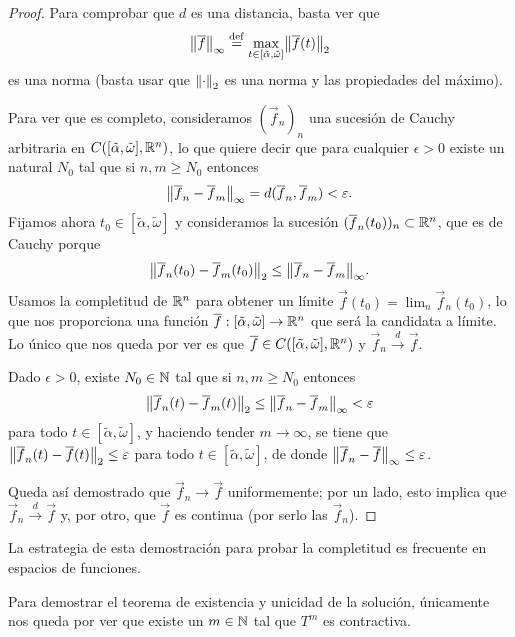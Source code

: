\documentclass[../ecuaciones_diferenciales.tex]{subfiles}
\begin{document}
\begin{proof}
	Para comprobar que \(d\) es una distancia, basta ver que
	\[\norm{\vec{f}}_\infty 
		\assign \max_{t \in [\tilde{\alpha}, \tilde{\omega}]} 
			\norm{\vec{f}(t)}_2\]
	es una norma (basta usar que \(\norm{\cdot}_2\) es una norma y las
	propiedades del máximo).

	Para ver que es completo, consideramos \((\vec{f}_n)_n\) una sucesión de 
	Cauchy arbitraria en \(C([\tilde{\alpha}, \tilde{\omega}], \mathbb{R}^n)\), 
	lo que quiere decir que para cualquier \(\epsilon > 0\) existe un 
	natural \(N_0\) tal que si \(n, m \geq N_0\) entonces
	\[\norm{\vec{f}_n - \vec{f}_m}_\infty 
		= d(\vec{f}_n, \vec{f}_m) < \epsilon.\] 
	Fijamos ahora \(t_0 \in [\tilde{\alpha}, \tilde{\omega}]\) y consideramos la 
	sucesión \((\overline{f}_n(t_0))_n \subset \mathbb{R}^n\), que es de Cauchy porque
	\[\norm{\vec{f}_n(t_0) - \vec{f}_m(t_0)}_2 
		\leq \norm{\vec{f}_n - \vec{f}_m}_\infty.\] 
	Usamos la completitud de \(\mathbb{R}^n\) para obtener un límite 
	\(\vec{f}(t_0) = \lim_n \vec{f}_n(t_0)\), lo
	que nos proporciona una función 
	\(\overline{f}: [\tilde{\alpha}, \tilde{\omega}] \to \mathbb{R}^n\) que será la candidata
	a límite. Lo único que nos queda por ver es que
	\(\overline{f} \in C([\tilde{\alpha}, \tilde{\omega}], \mathbb{R}^n)\) y 
	\(\vec{f}_n \overset{d}{\to} \vec{f}\).

	Dado \(\epsilon > 0\), existe \(N_0 \in \mathbb{N}\) tal que si \(n, m \geq N_0\)
	entonces 
	\[\norm{\vec{f}_n(t) - \vec{f}_m(t)}_2 
		\leq \norm{\vec{f}_n - \vec{f}_m}_\infty < \epsilon\]
	para todo \(t \in [\tilde{\alpha}, \tilde{\omega}]\), y haciendo tender
	\(m \to \infty\), se tiene que
	\(\norm{\vec{f}_n(t) - \vec{f}(t)}_2 \leq \epsilon\) para todo
	\(t \in [\tilde{\alpha}, \tilde{\omega}]\), de donde
	\(\norm{\vec{f}_n - \vec{f}}_\infty \leq \epsilon\).

	Queda así demostrado que \(\vec{f}_n \to \vec{f}\) uniformemente; 
	por un lado, esto implica que \(\vec{f}_n \overset{d}{\to} \vec{f}\) y, 
	por otro, que \(\vec{f}\) es continua (por serlo las \(\vec{f}_n\)).
\end{proof}

\begin{remark}
	La estrategia de esta demostración para probar la completitud es frecuente en
	espacios de funciones.
\end{remark}

Para demostrar el teorema de existencia y unicidad de la solución, únicamente
nos queda por ver que existe un \(m \in \mathbb{N}\) tal que \(T^m\) es contractiva.
\end{document}
